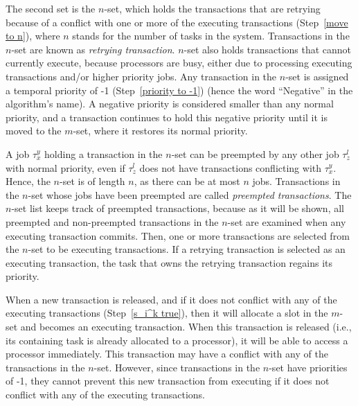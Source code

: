 %
The second set is the $n$-set, which holds the transactions
that are retrying because of a conflict with one or more of the executing
transactions (Step~\ref{move to n}), where $n$ stands for
the number of tasks in the system. Transactions in the $n$-set are known as \emph{retrying transaction}. $n$-set also holds transactions that
cannot currently execute, because processors are busy, either due to processing executing transactions and/or higher priority jobs. Any transaction in the $n$-set is assigned a temporal
priority of -1 (Step~\ref{priority to -1}) (hence the word 
``Negative'' in the algorithm's name). A negative priority
is considered smaller than any normal priority, and a transaction
continues to hold this negative priority until it is moved to the $m$-set, where it restores its normal priority.

A job $\tau_x^y$ holding a transaction in the $n$-set can be preempted by any other job $\tau_z^l$ with normal priority, even if $\tau_z^l$ does not have transactions conflicting with $\tau_x^y$. Hence, the $n$-set is of length $n$, as there can be at most $n$ jobs. Transactions in the $n$-set whose jobs have been preempted are called \textit{preempted transactions}. The $n$-set list keeps track of preempted transactions, because
as it will be shown, all preempted and non-preempted transactions in the $n$-set are examined when any executing transaction commits. Then, one or more transactions are selected from the $n$-set to be executing transactions. If a retrying transaction is selected as an executing transaction, the task that owns the retrying transaction regains its priority.

When a new transaction is released, and if it does not conflict with
any of the executing transactions (Step~\ref{s_i^k true}), then
it will allocate a slot in the $m$-set and becomes an
executing transaction. When this transaction is released (i.e., its containing task is already allocated to a processor), it will be able to access a processor immediately. 
This transaction may have a conflict with any of the transactions in the $n$-set. However, since transactions in the $n$-set have priorities of -1, they cannot prevent this new transaction from executing if it does not conflict with any of the executing transactions.

